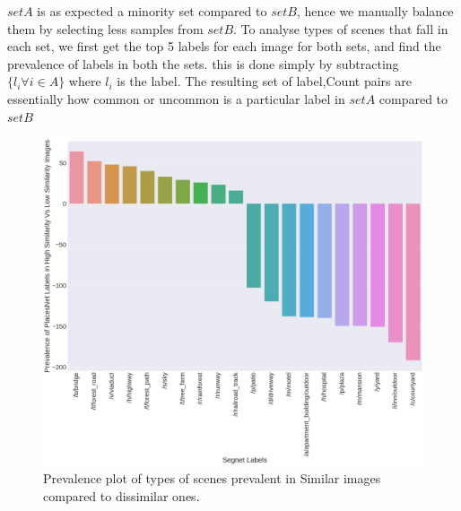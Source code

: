  $setA$ is as expected a minority set compared to $setB$, hence we manually balance them by selecting less samples from $setB$. To analyse types of scenes that fall in each set, we first get the top 5 labels for each image for both sets, and find the prevalence of labels in both the sets. this is done simply by subtracting $\{l_i   \forall i \in A\}$ where $l_i$ is the label. The resulting set of label,Count pairs are essentially how common or uncommon is a particular label in $setA$ compared to $setB$

\begin{figure}[ht]
	\centering
	\includegraphics[width=\columnwidth]{Plot/SimilarityPlacesPrevalence.png}
	\caption{Prevalence plot of types of scenes prevalent in Similar images compared to dissimilar ones.}
	\label{fig:augmentationSimilarity}
\end{figure}

